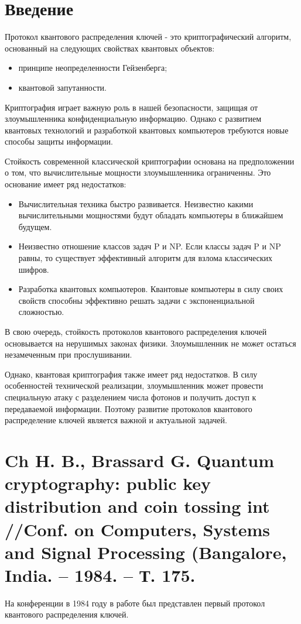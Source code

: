 





\section*{Введение}
Протокол квантового распределения ключей - это криптографический алгоритм, основанный на следующих свойствах квантовых объектов:

\begin{itemize}
\item принципе неопределенности Гейзенберга;
\item квантовой запутанности.
\end{itemize}

Криптография играет важную роль в нашей безопасности, защищая от злоумышленника конфиденциальную информацию. Однако с развитием квантовых технологий и разработкой квантовых компьютеров требуются новые способы защиты информации.

Стойкость современной классической криптографии основана на предположении о том, что вычислительные мощности злоумышленника ограниченны. Это основание имеет ряд недостатков:

\begin{itemize}
\item Вычислительная техника быстро развивается. Неизвестно какими вычислительными мощностями будут обладать компьютеры в ближайшем будущем.
\item Неизвестно отношение классов задач P и NP. Если классы задач P и NP равны, то существует эффективный алгоритм для взлома классических шифров.
\item Разработка квантовых компьютеров. Квантовые компьютеры в силу своих свойств способны эффективно решать задачи с экспоненциальной сложностью.
\end{itemize}

В свою очередь, стойкость протоколов квантового распределения ключей основывается на нерушимых законах физики. Злоумышленник не может остаться незамеченным при прослушивании.

Однако, квантовая криптография также имеет ряд недостатков. В силу особенностей технической реализации, злоумышленник может провести специальную атаку с разделением числа фотонов и получить доступ к передаваемой информации. Поэтому развитие протоколов квантового распределение ключей является важной и актуальной задачей.


\section{Ch H. B., Brassard G. Quantum cryptography: public key distribution and coin tossing int //Conf. on Computers, Systems and Signal Processing (Bangalore, India. – 1984. – Т. 175.}
На конференции в 1984 году в работе \cite{ch1984quantum} был представлен первый протокол квантового распределения ключей.


